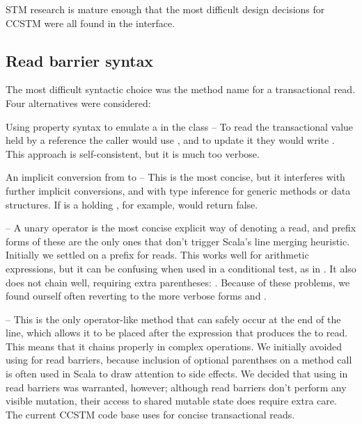 
STM research is mature enough that the most difficult design decisions
for CCSTM were all found in the interface.

\subsection{Read barrier syntax}
\label{sec:syntax}

The most difficult syntactic choice was the method name for a
transactional read.  Four alternatives were considered:

\begin{packed_enum}

\item Using property syntax to emulate a 
in the  class -- To read the transactional value held by a
reference  the caller would use , and to update it
they would write .  This approach is self-consistent,
but it is much too verbose.

\item An implicit conversion from  to  --
This is the most concise, but it interferes with further implicit
conversions, and with type inference for generic methods or data
structures.  If  is a  holding ,
for example,  would return false.

\item {} -- A unary operator is the most concise explicit
way of denoting a read, and prefix forms of these are the only ones
that don't trigger Scala's line merging heuristic.  Initially we
settled on a \code{!} prefix for reads.  This works well for arithmetic
expressions, but it can be confusing when used in a conditional test,
as in .  It also does not chain well, requiring
extra parentheses: .  Because of these problems, we
found ourself often reverting to the more verbose forms  and .

\item {} -- This is the only operator-like method that can
safely occur at the end of the line, which allows it to be placed after
the expression that produces the  to read.  This means that
it chains properly in complex operations.  We initially avoided using
 for read barriers, because inclusion of optional parenthses
on a method call is often used in Scala to draw attention to side effects.
We decided that using \code{()} in read barriers was warranted, however;
although read barriers don't perform any visible mutation, their access
to shared mutable state does require extra care.  The current CCSTM code
base uses  for concise transactional reads.

\end{packed_enum}

